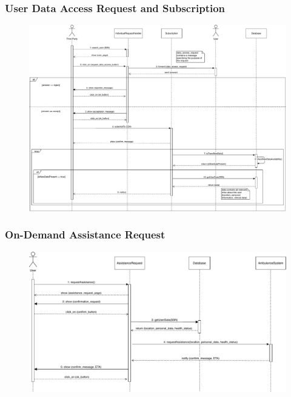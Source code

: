 \documentclass[12pt,a4paper]{article}
\begin{document}
		\subsubsection{User Data Access Request and Subscription}
			\begin{figure}[H]
				\centering
				\includegraphics[width=1.2\linewidth]{Images/request_subscription_sequence}
				\label{fig:request_subscription_sequence}
			\end{figure}
		\subsubsection{On-Demand Assistance Request}
			\begin{figure}[H]
				\centering
				\includegraphics[width=1.1\linewidth]{Images/ass_request_sequence}
				\label{fig:ass_request_sequence}
			\end{figure}
\end{document}
